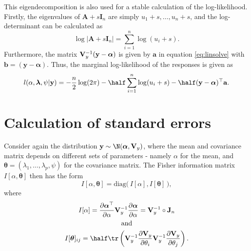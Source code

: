 \documentclass[english, 11pt]{article}
\begin{document}
This eigendecomposition is also used for a stable calculation of the log-likelihood. Firstly, the eigenvalues of $\mathbf A + s\mathbf I_n$ are simply $u_1 \!+\! s, \dots, u_n \!+\! s$, and the log-determinant can be calculated as
\[
	\log |\mathbf A + s\mathbf I_n| = \sum_{i=1}^n \log (u_i + s).
\]
Furthermore, the matrix $\mathbf{V}_y^{-1}(\mathbf y - \boldsymbol\alpha)$ is given by $\mathbf a$ in equation \eqref{eq:linsolve} with $\mathbf b = (\mathbf y - \boldsymbol\alpha)$. Thus, the marginal log-likelihood of the responses is given as
\[
	l(\alpha, \boldsymbol{\lambda}, \psi|\mathbf y) = -\frac{n}{2}\log(2\pi) - \half\sum_{i=1}^n \log (u_i + s) - \half(\mathbf y - \boldsymbol\alpha)^\top \mathbf a.
\]

\section{Calculation of standard errors}
\label{apx:e}

Consider again the distribution $\mathbf y \sim \N (\boldsymbol\alpha, \mathbf V_y)$, where the mean and covariance matrix depends on different sets of parameters - namely $\alpha$ for the mean, and $\boldsymbol{\theta}=(\lambda_1,\dots,\lambda_p,\psi)$ for the covariance matrix. The Fisher information matrix $I[\alpha, \boldsymbol{\theta}]$ then has the form
\[
	I[\alpha, \boldsymbol{\theta}]=\text{diag}\big(\, I[\alpha], I[\boldsymbol\theta] \, \big),
\]
where
\begin{align*}
	\begin{gathered}
		I[\alpha] = \frac{\partial\boldsymbol{\alpha}^\top}{\partial\alpha} \mathbf V_y^{-1} \frac{\partial\boldsymbol{\alpha}}{\partial\alpha} = \mathbf V_y^{-1} \circ \mathbf J_n \\
		\text{and} \\
		I[\boldsymbol{\theta}]_{ij} = \half\tr\left(\mathbf V_y^{-1}\frac{\partial\mathbf V_y}{\partial\theta_i}\mathbf V_y^{-1}\frac{\partial\mathbf V_y}{\partial\theta_j} \right).
	\end{gathered}
\end{align*}
\end{document}
